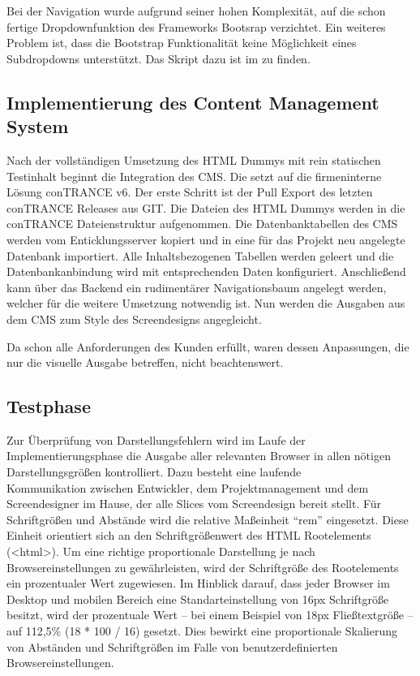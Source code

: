 Bei der Navigation wurde aufgrund seiner hohen Komplexität, auf die schon
fertige Dropdownfunktion des Frameworks Bootsrap verzichtet. Ein weiteres
Problem ist, dass die Bootstrap Funktionalität keine Möglichkeit eines
Subdropdowns unterstützt. Das Skript dazu ist im  zu
finden.

\subsection{Implementierung des Content Management System}
\label{sec:ImplementierungCMS}

Nach der vollständigen Umsetzung des \ac{HTML} Dummys mit rein statischen
Testinhalt beginnt die Integration des \ac{CMS}. Die \mh setzt auf die
firmeninterne Lösung conTRANCE v6. Der erste Schritt ist der Pull \bzw Export
des letzten conTRANCE Releases aus GIT. Die Dateien des HTML Dummys werden
in die conTRANCE Dateienstruktur aufgenommen. Die Datenbanktabellen des
\ac{CMS} werden vom Enticklungsserver kopiert und in eine für das Projekt neu
angelegte Datenbank importiert. Alle Inhaltsbezogenen Tabellen werden geleert
und die Datenbankanbindung wird mit entsprechenden Daten konfiguriert.
Anschließend kann über das Backend ein rudimentärer Navigationsbaum angelegt
werden, welcher für die weitere Umsetzung notwendig ist. Nun werden die Ausgaben
aus dem \ac{CMS} zum Style des Screendesigns angegleicht.

Da \ct schon alle Anforderungen des Kunden erfüllt, waren dessen Anpassungen,
die nur die visuelle Ausgabe betreffen, nicht beachtenswert.

\subsection{Testphase}
\label{sec:Testphase}
Zur Überprüfung von Darstellungsfehlern wird im Laufe der
Implementierungsphase die Ausgabe aller relevanten Browser in allen nötigen
Darstellungsgrößen kontrolliert. Dazu besteht eine laufende \\ Kommunikation
zwischen Entwickler, dem Projektmanagement und dem Screendesigner im Hause, der
alle Slices vom Screendesign bereit stellt.
Für Schriftgrößen und Abstände wird die relative Maßeinheit "`rem"' eingesetzt.
Diese Einheit orientiert sich an den Schriftgrößenwert des HTML
Rootelements (<html>). Um eine richtige proportionale Darstellung je nach
Browsereinstellungen zu gewährleisten, wird der Schriftgröße des Rootelements
ein prozentualer Wert zugewiesen. Im Hinblick darauf, dass jeder Browser im
Desktop und mobilen Bereich eine Standarteinstellung von 16px Schriftgröße
besitzt, wird der prozentuale Wert -- bei einem Beispiel von 18px
Fließtextgröße -- auf 112,5\% (18 * 100 / 16) gesetzt. Dies bewirkt eine
proportionale Skalierung von Abständen und Schriftgrößen im Falle von
benutzerdefinierten Browsereinstellungen.

